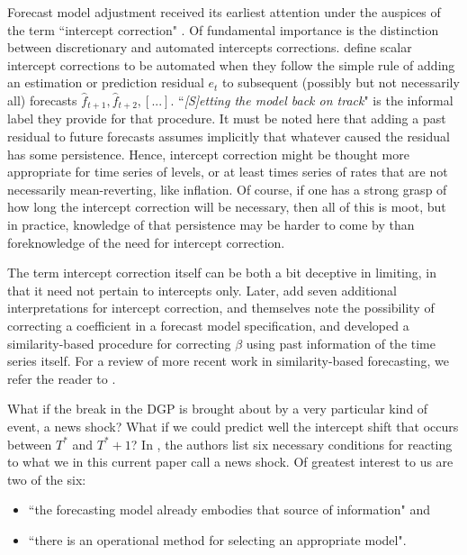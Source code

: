 \documentclass[11pt]{article}
\theoremstyle{definition}
\begin{document}
Forecast model adjustment received its earliest attention under the auspices of the term ``intercept correction" \citep{hendry1994theory,clements1996intercept,clements1998forecasting, clements1999forecasting}.  Of fundamental importance is the distinction between discretionary and automated intercepts corrections. \cite{hendry1994theory} define scalar intercept corrections to be automated when they follow the simple rule of adding an estimation or prediction residual $e_{t}$ to subsequent (possibly but not necessarily all) forecasts $\hat f_{t+1},\hat f_{t+2},[...].$ ``\textit{[S]etting the model back on track}" is the informal label they provide for that procedure.  It must be noted here that adding a past residual to future forecasts assumes implicitly that whatever caused the residual has some persistence.  Hence, intercept correction might be thought more appropriate for time series of levels, or at least times series of rates that are not necessarily mean-reverting, like inflation.  Of course, if one has a strong grasp of how long the intercept correction will be necessary, then all of this is moot, but in practice, knowledge of that persistence may be harder to come by than foreknowledge of the need for intercept correction. 
 
The term intercept correction itself can be both a bit deceptive in limiting, in that it need not pertain to intercepts only.  Later, \cite{clements1999forecasting} add seven additional interpretations for intercept correction, and \cite{hendry1994theory, clements1999forecasting} themselves note the possibility of correcting a coefficient in a forecast model specification, and \cite{guerron2017macroeconomic} developed a similarity-based procedure for correcting $\beta$ using past information of the time series itself.   For a review of more recent work in similarity-based forecasting, we refer the reader to \cite{lundquist2024volatility}.

What if the break in the DGP is brought about by a very particular kind of event, a news shock?   What if we could predict well the intercept shift that occurs between $T^{*}$ and $T^{*}+1$?  In \cite{castle2016overview}, the authors list six necessary conditions for reacting to what we in this current paper call a news shock.  Of greatest interest to us are two of the six: 

\begin{itemize}
\item ``the forecasting model already embodies that source of information" and 
\item ``there is an operational method for selecting an appropriate model".
\end{itemize}   
\end{document}
